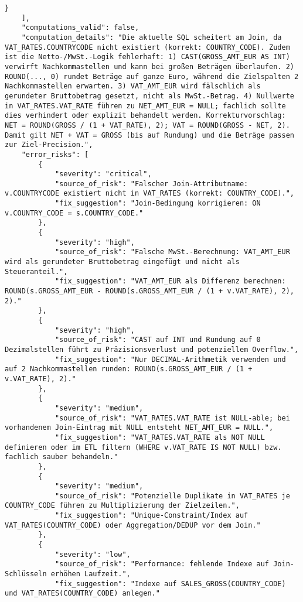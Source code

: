 \begin{lstlisting}[caption={Ausgabe: GPT-5 Anwendungsfall 5 Robustheitsdurchlauf},label={gpt_case5_prompt3}]
        }
    ],
    "computations_valid": false,
    "computation_details": "Die aktuelle SQL scheitert am Join, da VAT_RATES.COUNTRYCODE nicht existiert (korrekt: COUNTRY_CODE). Zudem ist die Netto-/MwSt.-Logik fehlerhaft: 1) CAST(GROSS_AMT_EUR AS INT) verwirft Nachkommastellen und kann bei großen Beträgen überlaufen. 2) ROUND(..., 0) rundet Beträge auf ganze Euro, während die Zielspalten 2 Nachkommastellen erwarten. 3) VAT_AMT_EUR wird fälschlich als gerundeter Bruttobetrag gesetzt, nicht als MwSt.-Betrag. 4) Nullwerte in VAT_RATES.VAT_RATE führen zu NET_AMT_EUR = NULL; fachlich sollte dies verhindert oder explizit behandelt werden. Korrekturvorschlag: NET = ROUND(GROSS / (1 + VAT_RATE), 2); VAT = ROUND(GROSS - NET, 2). Damit gilt NET + VAT = GROSS (bis auf Rundung) und die Beträge passen zur Ziel-Precision.",
    "error_risks": [
        {
            "severity": "critical",
            "source_of_risk": "Falscher Join-Attributname: v.COUNTRYCODE existiert nicht in VAT_RATES (korrekt: COUNTRY_CODE).",
            "fix_suggestion": "Join-Bedingung korrigieren: ON v.COUNTRY_CODE = s.COUNTRY_CODE."
        },
        {
            "severity": "high",
            "source_of_risk": "Falsche MwSt.-Berechnung: VAT_AMT_EUR wird als gerundeter Bruttobetrag eingefügt und nicht als Steueranteil.",
            "fix_suggestion": "VAT_AMT_EUR als Differenz berechnen: ROUND(s.GROSS_AMT_EUR - ROUND(s.GROSS_AMT_EUR / (1 + v.VAT_RATE), 2), 2)."
        },
        {
            "severity": "high",
            "source_of_risk": "CAST auf INT und Rundung auf 0 Dezimalstellen führt zu Präzisionsverlust und potenziellem Overflow.",
            "fix_suggestion": "Nur DECIMAL-Arithmetik verwenden und auf 2 Nachkommastellen runden: ROUND(s.GROSS_AMT_EUR / (1 + v.VAT_RATE), 2)."
        },
        {
            "severity": "medium",
            "source_of_risk": "VAT_RATES.VAT_RATE ist NULL-able; bei vorhandenem Join-Eintrag mit NULL entsteht NET_AMT_EUR = NULL.",
            "fix_suggestion": "VAT_RATES.VAT_RATE als NOT NULL definieren oder im ETL filtern (WHERE v.VAT_RATE IS NOT NULL) bzw. fachlich sauber behandeln."
        },
        {
            "severity": "medium",
            "source_of_risk": "Potenzielle Duplikate in VAT_RATES je COUNTRY_CODE führen zu Multiplizierung der Zielzeilen.",
            "fix_suggestion": "Unique-Constraint/Index auf VAT_RATES(COUNTRY_CODE) oder Aggregation/DEDUP vor dem Join."
        },
        {
            "severity": "low",
            "source_of_risk": "Performance: fehlende Indexe auf Join-Schlüsseln erhöhen Laufzeit.",
            "fix_suggestion": "Indexe auf SALES_GROSS(COUNTRY_CODE) und VAT_RATES(COUNTRY_CODE) anlegen."

\end{lstlisting}
